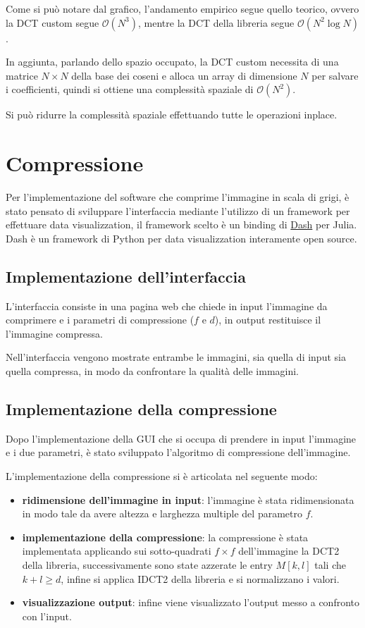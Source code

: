 Come si può notare dal grafico, l'andamento empirico segue quello teorico, ovvero
la DCT custom segue $\mathcal{O}(N^3)$, mentre la DCT della libreria segue $\mathcal{O}(N^2\log N)$.

In aggiunta, parlando dello spazio occupato, la DCT custom necessita di una matrice 
$N\times N$ della base dei coseni e alloca un array di dimensione $N$ per salvare 
i coefficienti, quindi si ottiene una complessità spaziale di $\mathcal{O}(N^2)$.

Si può ridurre la complessità spaziale effettuando tutte le operazioni inplace.

\section{Compressione}
Per l'implementazione del software che comprime l'immagine in scala di grigi, è
stato pensato di sviluppare l'interfaccia mediante l'utilizzo di un framework per effettuare 
data visualizzation, il framework scelto è un binding di \href{https://github.com/plotly/dash}{Dash} per Julia. Dash 
è un framework di Python per data visualizzation interamente open source.

\subsection{Implementazione dell'interfaccia}
L'interfaccia consiste in una pagina web che chiede in input l'immagine da comprimere
e i parametri di compressione ($f$ e $d$), in output restituisce il l'immagine compressa.

Nell'interfaccia vengono mostrate entrambe le immagini, sia quella di input sia quella 
compressa, in modo da confrontare la qualità delle immagini.

\subsection{Implementazione della compressione}
Dopo l'implementazione della GUI che si occupa di prendere in input l'immagine e
i due parametri, è stato sviluppato l'algoritmo di compressione dell'immagine.

L'implementazione della compressione si è articolata nel seguente modo:
\begin{itemize}
    \item \textbf{ridimensione dell'immagine in input}: l'immagine è stata ridimensionata
          in modo tale da avere altezza e larghezza multiple del parametro $f$.
    \item \textbf{implementazione della compressione}: la compressione è stata implementata
          applicando sui sotto-quadrati $f\times f$ dell'immagine la DCT2 della libreria,
          successivamente sono state azzerate le entry $M[k,l]$ tali che $k+l\ge d$, infine
          si applica IDCT2 della libreria e si normalizzano i valori.
    \item \textbf{visualizzazione output}: infine viene visualizzato l'output
          messo a confronto con l'input.
\end{itemize}

